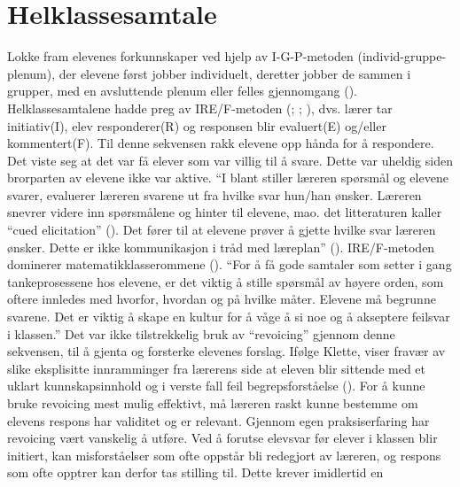 \documentclass[12pt,twoside,onecolumn,norsk]{article}
\begin{document}
\section*{Helklassesamtale}
Lokke fram elevenes forkunnskaper ved hjelp av I-G-P-metoden (individ-gruppe-plenum), 
der elevene først jobber individuelt, deretter jobber de sammen i grupper, med en avsluttende 
plenum eller felles gjennomgang (). %
\newline
\newline
Helklassesamtalene hadde preg av IRE/F-metoden (; ; 
), dvs. lærer tar initiativ(I), elev responderer(R) og responsen blir 
evaluert(E) og/eller kommentert(F). Til denne sekvensen rakk elevene opp hånda for å respondere. 
Det viste seg at det var få elever som var villig til å svare. Dette var uheldig siden brorparten 
av elevene ikke var aktive. ``I blant stiller læreren spørsmål og elevene svarer, evaluerer 
læreren svarene ut fra hvilke svar hun/han ønsker. Læreren snevrer videre inn spørsmålene og 
hinter til elevene, mao. det litteraturen kaller ``cued elicitation'' (). 
Det fører til at elevene prøver å gjette hvilke svar læreren ønsker. Dette er ikke kommunikasjon 
i tråd med læreplan'' (). IRE/F-metoden dominerer matematikklasserommene 
(). ``For å få gode samtaler som setter i gang tankeprosessene hos elevene, 
er det viktig å stille spørsmål av høyere orden, som oftere innledes med hvorfor, hvordan og på 
hvilke måter. Elevene må begrunne svarene. Det er viktig å skape en kultur for å våge å si noe 
og å akseptere feilsvar i klassen.''
\newline
\newline
Det var ikke tilstrekkelig bruk av ``revoicing'' gjennom denne sekvensen, til å gjenta og 
forsterke elevenes forslag. Ifølge Klette, viser fravær av slike eksplisitte innramminger 
fra lærerens side at eleven blir sittende med et uklart kunnskapsinnhold og i verste fall 
feil begrepsforståelse (). For å kunne bruke revoicing mest mulig 
effektivt, må læreren raskt kunne bestemme om elevens respons har validitet og er relevant. 
Gjennom egen praksiserfaring har revoicing vært vanskelig å utføre. Ved å forutse elevsvar 
før elever i klassen blir initiert, kan misforståelser som ofte oppstår bli redegjort av 
læreren, og respons som ofte opptrer kan derfor tas stilling til. Dette krever imidlertid en 
\end{document}
